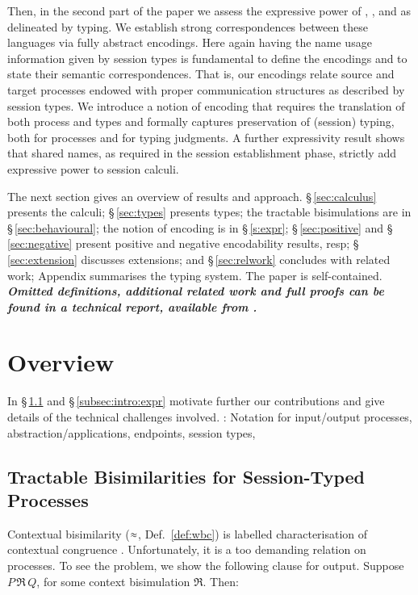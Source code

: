 Then, in the second part of the paper we assess the expressive 
power of \HOp, \HO, and \sessp as delineated by typing. 
We establish strong correspondences between 
these languages via fully abstract encodings. 
Here again having the name usage information given by session types is fundamental to define the encodings
and to state their semantic correspondences.
That is, our encodings relate source and target processes
endowed with proper communication structures as described by session types. 
We introduce a notion of encoding that 
requires the translation of both process and types and 
formally captures preservation of (session) typing,
both for processes and for typing judgments. 
A further expressivity result shows that shared names, 
as required in the session establishment phase,
 strictly add expressive power 
to session calculi. 
\smallskip

The next section gives an overview of results and approach.
\noi \S\,\ref{sec:calculus} presents the calculi; 
\S\,\ref{sec:types} presents types;
the tractable bisimulations are in \S\,\ref{sec:behavioural};
the notion of encoding is in \S\,\ref{s:expr};
\S\,\ref{sec:positive} and \S\,\ref{sec:negative}
present positive and negative encodability results, resp;
\S\,\ref{sec:extension} discusses extensions; and 
\S\,\ref{sec:relwork} concludes with related work;
Appendix summarises the typing system. 
The paper is self-contained. 
{\bf\em Omitted definitions, additional related work and full proofs can be found 
in a technical report, available from \cite{KouzapasPY15}.} 

\section{Overview}
\label{sec:overview}
\noi
In  \S\,\ref{subsec:intro:bisimulation}
and
\S\,\ref{subsec:intro:expr}
motivate further our contributions and 
give details of the technical challenges involved. 
: Notation for input/output processes, abstraction/applications, endpoints, 
session types, 


\subsection{Tractable Bisimilarities for Session-Typed Processes}
\label{subsec:intro:bisimulation}
\noi 
{}
Contextual bisimilarity ($\approx$, Def.~\ref{def:wbc}) is 
labelled characterisation of contextual congruence 
\cite{SaWabook}. 
Unfortunately, it is a too demanding relation on processes. 
To see the problem, we show 
the following clause for output.
Suppose $P \,\Re\, Q$, for some context bisimulation $\Re$. Then:

